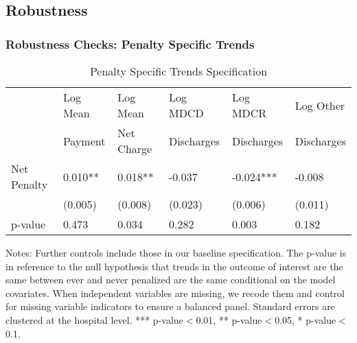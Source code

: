 \documentclass{beamer}
\begin{document}
\subsection{Robustness}

\begin{frame}
\frametitle{Robustness Checks: Penalty Specific Trends}
\begin{table}[htp]
\centering \normalsize
\caption{Penalty Specific Trends Specification}
\footnotesize
\begin{tabular}{llllll}
\hline	\hline
	& Log Mean 		& Log Mean	    & Log MDCD 	   	& Log MDCR   		& Log Other  			\\
		& Payment		& Net Charge	& Discharges      & Discharges       & Discharges    \\	
\hline											
Net Penalty  	&	0.010**	&	0.018**	&	-0.037	&	-0.024***	&	-0.008	\\
	&	(0.005)	&	(0.008)	&	(0.023)	&	(0.006)	&	(0.011)	\\
p-value & 0.473 & 0.034 & 0.282 & 0.003 & 0.182 \\
\hline
\end{tabular}
\end{table}
\tiny Notes: Further controls include those in our baseline speciﬁcation. The p-value is in reference to the null hypothesis that trends in the outcome of interest are the same between ever and never penalized are the same conditional on the model covariates. When independent variables are missing, we recode them and control for missing variable indicators to ensure a balanced panel. Standard errors are clustered at the hospital level. *** p-value$<$0.01, ** p-value$<$0.05, * p-value$<$0.1.
\end{frame}
\end{document}
